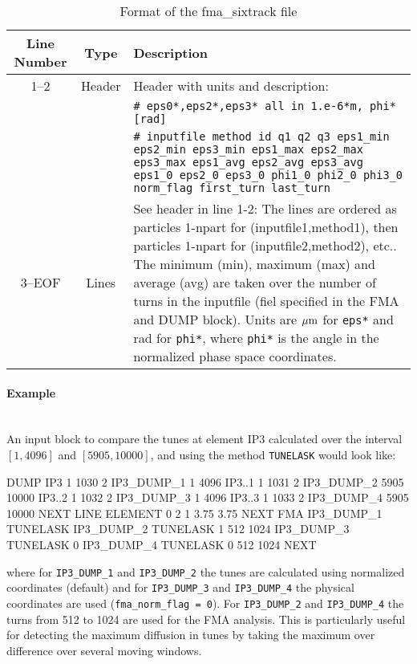 \begin{table}[h]
\begin{center}
    \caption{Format of the fma\_sixtrack file}\label{fma:tab:3}
    \begin{tabularx}{\textwidth}{|c|c|X|}
        \hline
        \rowcolor{blue!30}
        \textbf{Line Number} & \textbf{Type} & \textbf{Description} \\
        \hline
        1--2 & Header & Header with units and description:\\
             &        & \texttt{\# eps0*,eps2*,eps3* all in 1.e-6*m, phi* [rad]} \\
             &        & \texttt{\# inputfile method id q1 q2 q3 eps1\_min eps2\_min eps3\_min eps1\_max eps2\_max eps3\_max eps1\_avg eps2\_avg eps3\_avg eps1\_0 eps2\_0 eps3\_0 phi1\_0 phi2\_0 phi3\_0 norm\_flag first\_turn last\_turn}\\
        \hline
        3--EOF & Lines & See header in line 1-2: The lines are ordered as particles 1-npart for (inputfile1,method1), then  particles 1-npart for (inputfile2,method2), etc.. The minimum (min), maximum (max) and average (avg) are taken over the number of turns in the inputfile (fiel specified in the FMA and DUMP block). Units are $\mu \rm m$ for \texttt{eps*} and rad for \texttt{phi*}, where \texttt{phi*} is the angle in the normalized phase space coordinates.\\
        \hline
    \end{tabularx}
\end{center}
\end{table}

\paragraph{Example}~\\

An input block to compare the tunes at element IP3 calculated over the interval $[1,4096]$ and $[5905,10000]$, and using the method \texttt{TUNELASK} would look like:
\begin{cverbatim}
DUMP
IP3 1 1030 2 IP3_DUMP_1 1 4096
IP3..1 1 1031 2 IP3_DUMP_2 5905 10000
IP3..2 1 1032 2 IP3_DUMP_3 1 4096
IP3..3 1 1033 2 IP3_DUMP_4 5905 10000
NEXT
LINE
ELEMENT  0 2 1 3.75 3.75
NEXT
FMA
IP3_DUMP_1 TUNELASK
IP3_DUMP_2 TUNELASK 1 512 1024
IP3_DUMP_3 TUNELASK 0
IP3_DUMP_4 TUNELASK 0 512 1024
NEXT
\end{cverbatim}
where for \texttt{IP3\_DUMP\_1} and \texttt{IP3\_DUMP\_2} the tunes are calculated using normalized coordinates (default) and for \texttt{IP3\_DUMP\_3} and \texttt{IP3\_DUMP\_4} the physical coordinates are used (\texttt{fma\_norm\_flag = 0}).
For \texttt{IP3\_DUMP\_2} and \texttt{IP3\_DUMP\_4} the turns from 512 to 1024 are used for the FMA analysis. This is particularly useful for detecting the maximum diffusion in tunes by taking the maximum over difference over several moving windows.

